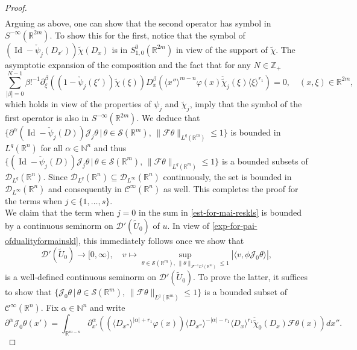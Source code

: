 \documentclass[12pt,reqno]{amsart}
\newcommand{\NN}{\mathbb N}
\newcommand{\RR}{\mathbb R}
\newcommand{\ZZ}{\mathbb Z}
\newcommand{\DD}{\mathcal D}
\newcommand{\SSS}{\mathcal S}
\theoremstyle{plain}
\theoremstyle{remark}
\theoremstyle{definition}
\numberwithin{equation}{section}
\begin{document}
\begin{proof}
\begin{align*}
\end{align*}
Arguing as above, one can show that the second operator has symbol in $S^{-\infty}(\RR^{2m})$. To show this for the first, notice that the symbol of $(\operatorname{Id}-\check{\psi}_j(D_{x'}))\widetilde{\chi}(D_x)$ is in $S^0_{1,0}(\RR^{2m})$ in view of the support of $\widetilde{\chi}$. The asymptotic expansion of the composition and the fact that for any $N\in\ZZ_+$
\begin{equation*}
\sum_{|\beta|=0}^{N-1}\beta!^{-1}\partial^{\beta}_{\xi}\left((1-\check{\psi}_j(\xi'))\widetilde{\chi}(\xi)\right) D^{\beta}_x\left(\langle x''\rangle^{m-n}\varphi(x)\check{\widetilde{\chi}}_j(\xi)\langle \xi\rangle^{r_1}\right)=0,\quad (x,\xi)\in\RR^{2m},
\end{equation*}
which holds in view of the properties of $\psi_j$ and $\widetilde{\chi}_j$, imply that the symbol of the first operator is also in $S^{-\infty}(\RR^{2m})$. We deduce that $\{\partial^{\alpha}(\operatorname{Id}-\check{\psi}_j(D))\mathcal{J}_j\theta\,|\, \theta\in\SSS(\RR^m),\, \|\mathcal{F}\theta\|_{L^q(\RR^m)}\leq1\}$ is bounded in $L^q(\RR^n)$ for all $\alpha\in\NN^n$ and thus $\{(\operatorname{Id}-\check{\psi}_j(D))\mathcal{J}_j\theta\,|\, \theta\in\SSS(\RR^m),\, \|\mathcal{F}\theta\|_{L^q(\RR^m)}\leq1\}$ is a bounded subsets of $\DD_{L^q}(\RR^n)$. Since $\DD_{L^q}(\RR^n)\subseteq\DD_{L^{\infty}}(\RR^n)$ continuously, the set is bounded in $\DD_{L^{\infty}}(\RR^n)$ and consequently in $\mathcal{C}^{\infty}(\RR^n)$ as well. This completes the proof for the terms when $j\in\{1,\ldots,s\}$.\\
\indent We claim that the term when $j=0$ in the sum in \eqref{est-for-mai-reskls} is bounded by a continuous seminorm on $\DD'(\widetilde{U}_0)$ of $u$. In view of \eqref{exp-for-pai-ofdualityformainskl}, this immediately follows once we show that
\begin{equation*}
\DD'(\widetilde{U}_0)\rightarrow[0,\infty),\quad v\mapsto \sup_{\theta\in\SSS(\RR^m),\, \|\theta\|_{\mathcal{F}^{-1}L^q(\RR^m)}\leq 1} |\langle v, \phi\mathcal{J}_0\theta\rangle|,
\end{equation*}
is a well-defined continuous seminorm on $\DD'(\widetilde{U}_0)$. To prove the latter, it suffices to show that $\{\mathcal{J}_0\theta\,|\, \theta\in\SSS(\RR^m),\, \|\mathcal{F}\theta\|_{L^q(\RR^m)}\leq 1\}$ is a bounded subset of $\mathcal{C}^{\infty}(\RR^n)$. Fix $\alpha\in\NN^n$ and write
\begin{equation*}
\partial^{\alpha}\mathcal{J}_0\theta(x')=\int_{\RR^{m-n}}\partial^{\alpha}_{x'}\left(\left(\langle D_{x''}\rangle^{|\alpha|+r_1}\varphi(x)\right)\langle D_{x''}\rangle^{-|\alpha|-r_1} \langle D_x\rangle^{r_1}\check{\widetilde{\chi}}_0(D_x)\mathcal{F}\theta(x)\right)dx''.

\end{equation*}
\end{proof}
\end{document}
